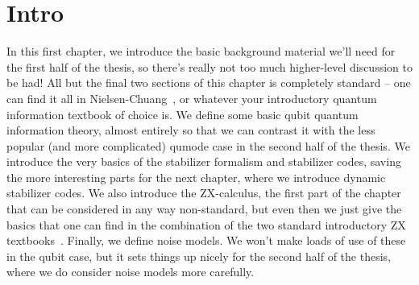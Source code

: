 \section{Intro}

In this first chapter, we introduce the basic background material we'll need for the first half of the thesis, so there's really not too much higher-level discussion to be had!
All but the final two sections of this chapter is completely standard -- one can find it all in Nielsen-Chuang~\cite{Nielsen_Chuang_2010}, or whatever your introductory quantum information textbook of choice is.
We define some basic qubit quantum information theory, almost entirely so that we can contrast it with the less popular (and more complicated) qumode case in the second half of the thesis.
We introduce the very basics of the stabilizer formalism and stabilizer codes, saving the more interesting parts for the next chapter, where we introduce dynamic stabilizer codes.
We also introduce the ZX-calculus, the first part of the chapter that can be considered in any way non-standard, but even then we just give the basics that one can find in the combination of the two standard introductory ZX textbooks~\cite{Coecke_Kissinger_2017,KissingerWetering2024Book}.
Finally, we define noise models.
We won't make loads of use of these in the qubit case, but it sets things up nicely for the second half of the thesis, where we do consider noise models more carefully.